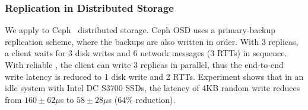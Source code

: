 \subsubsection{Replication in Distributed Storage}
\label{subsec:ceph}


We apply \sys{} to Ceph~\cite{weil2006ceph} distributed storage. Ceph OSD uses a primary-backup replication scheme, where the backups are also written in order. With 3 replicas, a client waits for 3 disk writes and 6 network messages (3 RTTs) in sequence. With reliable \sys{}, the client can write 3 replicas in parallel, thus the end-to-end write latency is reduced to 1 disk write and 2 RTTs. Experiment shows that in an idle system with Intel DC S3700 SSDs, the latency of 4KB random write reduces from $160 \pm 62 \mu$s to $58 \pm 28 \mu$s (64\% reduction).






